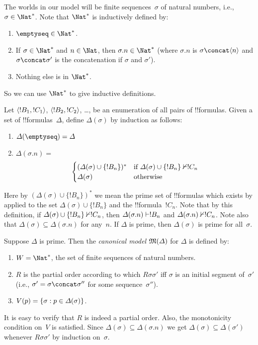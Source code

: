 \documentclass[../../../include/open-logic-section]{subfiles}
\begin{document}


The worlds in our model will be finite sequences~$\sigma$ of natural
numbers, i.e., $\sigma \in \Nat^*$. Note that $\Nat^*$ is inductively
defined by:
\begin{enumerate}
\item $\emptyseq \in \Nat^*$.
\item If $\sigma \in \Nat^*$ and $n \in \Nat$, then $\sigma.n \in
  \Nat^*$ (where $\sigma.n$ is $\sigma \concat \tuple{n}$ and $\sigma \concat \sigma'$ is the concatenation if $\sigma$ and $\sigma'$).
\item Nothing else is in $\Nat^*$.
\end{enumerate}
So we can use $\Nat^*$ to give inductive definitions.

Let $\langle !B_1, !C_1 \rangle$, $\langle !B_2, !C_2 \rangle$, \dots, be an
enumeration of all pairs of !!{formula}s. Given a set of
!!{formula}s~$\Delta$, define $\Delta(\sigma)$ by induction as
follows:
\begin{enumerate}
\item $\Delta(\emptyseq) = \Delta$
\item $\Delta(\sigma.n) = {}$
  \[
  \begin{cases}
    (\Delta(\sigma) \cup \{!B_n\})^* &
    \text{if $\Delta(\sigma) \cup \{!B_n\} \Proves/ !C_n$} \\
    \Delta(\sigma) & \text{otherwise}
  \end{cases}
  \]
\end{enumerate}
Here by $(\Delta(\sigma) \cup \{!B_n\})^*$ we mean the prime set of
!!{formula}s which exists by  applied to the
set $\Delta(\sigma) \cup \{!B_n\}$ and the !!{formula}~$!C_n$. Note that by this definition, if
$\Delta(\sigma) \cup \{!B_n\} \Proves/ !C_n$, then $\Delta(\sigma.n)
\Proves !B_n$ and $\Delta(\sigma.n) \Proves/ !C_n$.  Note also that
$\Delta(\sigma) \subseteq \Delta(\sigma.n)$ for any~$n$. If $\Delta$
is prime, then $\Delta(\sigma)$ is prime for all~$\sigma$.

\begin{defn}
  Suppose $\Delta$ is prime.  Then the \emph{canonical model} $\mModel{M(\Delta)}$ for
  $\Delta$ is defined by:
  \begin{enumerate}
  \item $W = \Nat^*$, the set of finite sequences of natural numbers.
  \item $R$ is the partial order according to which $R\sigma\sigma'$
    iff $\sigma$ is an initial segment of~$\sigma'$ (i.e., $\sigma' =
    \sigma \concat \sigma''$ for some sequence~$\sigma''$).
  \item $V(p) = \{ \sigma : p \in \Delta(\sigma) \}$.
  \end{enumerate}
\end{defn}

It is easy to verify that $R$ is indeed a partial order. Also, the
monotonicity condition on~$V$ is satisfied.  Since $\Delta(\sigma)
\subseteq \Delta(\sigma.n)$ we get $\Delta(\sigma)
\subseteq \Delta(\sigma')$ whenever $R\sigma\sigma'$ by induction
on~$\sigma$.
\end{document}
